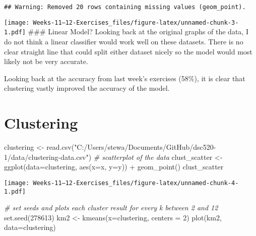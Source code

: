 \documentclass[
]{article}
\newenvironment{Shaded}{\begin{snugshade}}{\end{snugshade}}
\newcommand{\AttributeTok}[1]{\textcolor[rgb]{0.77,0.63,0.00}{#1}}
\newcommand{\CommentTok}[1]{\textcolor[rgb]{0.56,0.35,0.01}{\textit{#1}}}
\newcommand{\DecValTok}[1]{\textcolor[rgb]{0.00,0.00,0.81}{#1}}
\newcommand{\FunctionTok}[1]{\textcolor[rgb]{0.00,0.00,0.00}{#1}}
\newcommand{\NormalTok}[1]{#1}
\newcommand{\OtherTok}[1]{\textcolor[rgb]{0.56,0.35,0.01}{#1}}
\newcommand{\SpecialCharTok}[1]{\textcolor[rgb]{0.00,0.00,0.00}{#1}}
\newcommand{\StringTok}[1]{\textcolor[rgb]{0.31,0.60,0.02}{#1}}
\begin{document}
\begin{verbatim}
## Warning: Removed 20 rows containing missing values (geom_point).
\end{verbatim}

\texttt{[image: Weeks-11---12-Exercises\_files/figure-latex/unnamed-chunk-3-1.pdf]}
\#\#\# Linear Model? Looking back at the original graphs of the data, I
do not think a linear classifier would work well on these datasets.
There is no clear straight line that could split either dataset nicely
so the model would most likely not be very accurate.

Looking back at the accuracy from last week's exercises (58\%), it is
clear that clustering vastly improved the accuracy of the model.

\hypertarget{clustering}{%
\section{Clustering}\label{clustering}}

\begin{Shaded}
\begin{Highlighting}[]
\NormalTok{clustering }\OtherTok{\textless{}{-}} \FunctionTok{read.csv}\NormalTok{(}\StringTok{"C:/Users/stewa/Documents/GitHub/dsc520{-}1/data/clustering{-}data.csv"}\NormalTok{)}
\CommentTok{\# scatterplot of the data}
\NormalTok{clust\_scatter }\OtherTok{\textless{}{-}} \FunctionTok{ggplot}\NormalTok{(}\AttributeTok{data=}\NormalTok{clustering, }\FunctionTok{aes}\NormalTok{(}\AttributeTok{x=}\NormalTok{x, }\AttributeTok{y=}\NormalTok{y)) }\SpecialCharTok{+} \FunctionTok{geom\_point}\NormalTok{()}
\NormalTok{clust\_scatter}
\end{Highlighting}
\end{Shaded}

\texttt{[image: Weeks-11---12-Exercises\_files/figure-latex/unnamed-chunk-4-1.pdf]}

\begin{Shaded}
\begin{Highlighting}[]
\CommentTok{\# set seeds and plots each cluster result for every k between 2 and 12}
\FunctionTok{set.seed}\NormalTok{(}\DecValTok{278613}\NormalTok{)}
\NormalTok{km2 }\OtherTok{\textless{}{-}} \FunctionTok{kmeans}\NormalTok{(}\AttributeTok{x=}\NormalTok{clustering, }\AttributeTok{centers =} \DecValTok{2}\NormalTok{)}
\FunctionTok{plot}\NormalTok{(km2, }\AttributeTok{data=}\NormalTok{clustering)}
\end{Highlighting}
\end{Shaded}
\end{document}
